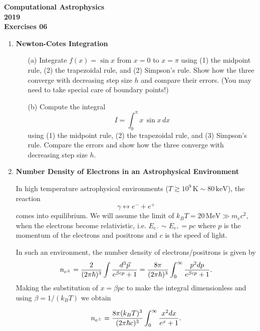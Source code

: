 \documentclass[11pt]{article}
\begin{document}
\begin{center}
\large \bf Computational Astrophysics \rm \\
2019\\
{\small Exercises 06}
\end{center}

\begin{enumerate}
\item {\bf Newton-Cotes Integration} 
\begin{enumerate}
\item[(a)] Integrate $f(x) = \sin{x}$ from $x = 0$ to $x = \pi$
  using (1) the midpoint rule, (2) the trapezoidal rule, and (2)
  Simpson's rule. Show how the three converge with decreasing step
  size $h$ and compare their errors. (You may need to take
  special care of boundary points!)
\item[(b)] Compute the integral
\begin{equation*}
I = \int_{0}^\pi x \, \sin{x}\, dx
\end{equation*}
using (1) the midpoint rule, (2) the trapezoidal rule, and (3)
Simpson's rule. Compare the errors and show how the three converge
with decreasing step size $h$.
\end{enumerate}


\item {\bf Number Density of Electrons in an Astrophysical Environment}

In high temperature astrophysical environments ($T \gtrsim 10^9\,\mathrm{K} \sim
80\,\mathrm{keV}$), the reaction 
\begin{equation}
\gamma \leftrightarrow e^- + e^+
\end{equation}
comes into equilibrium. We will assume the
limit of $k_B T = 20\,\mathrm{MeV} \gg m_ec^2$, when the electrons
become relativistic, i.e. $E_{e^-} \sim E_{e^+} = pc$ where $p$ is the
momentum of the electrons and positrons and $c$ is the speed of light.

In such an environment, the number density of electrons/positrons is given by
\begin{equation}
n_{e^\pm} = {2 \over (2\pi\hbar)^3}\int { d^3\vec{p} \over
  e^{\beta c p} + 1} = {8\pi \over (2\pi\hbar)^3}\int_0^\infty {p^2 dp \over
  e^{\beta c p} + 1}.
\end{equation}
Making the substitution of $x= \beta p c$ to make the integral
dimensionless and using $\beta = 1/(k_B T)$ we obtain

\begin{equation}
n_{e^\pm}  =  {8\pi (k_BT)^3 \over (2\pi\hbar
  c)^3}\int_0^\infty  {x^2 dx \over
  e^{x} + 1}.
\end{equation}
 

\end{enumerate}
\end{document}
